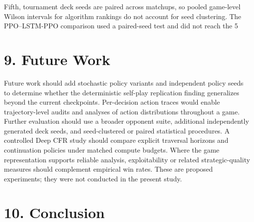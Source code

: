 \documentclass[11pt]{article}
\begin{document}
Fifth, tournament deck seeds are paired across matchups, so pooled game-level Wilson intervals for algorithm rankings do not account for seed clustering. The PPO--LSTM-PPO comparison used a paired-seed test and did not reach the 5\\%

\section*{9. Future Work}

Future work should add stochastic policy variants and independent policy seeds to determine whether the deterministic self-play replication finding generalizes beyond the current checkpoints. Per-decision action traces would enable trajectory-level audits and analyses of action distributions throughout a game. Further evaluation should use a broader opponent suite, additional independently generated deck seeds, and seed-clustered or paired statistical procedures. A controlled Deep CFR study should compare explicit traversal horizons and continuation policies under matched compute budgets. Where the game representation supports reliable analysis, exploitability or related strategic-quality measures should complement empirical win rates. These are proposed experiments; they were not conducted in the present study.

\section*{10. Conclusion}
\end{document}
